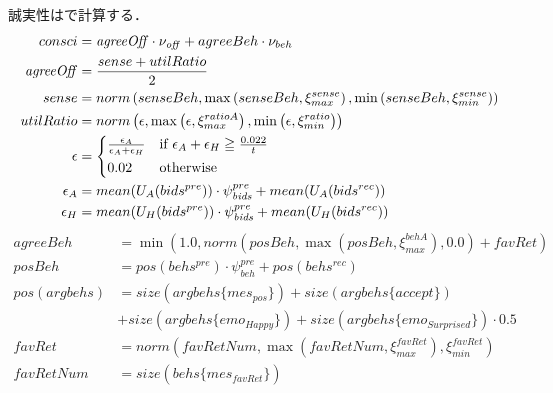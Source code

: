 誠実性はで計算する．
\begin{align}
    consci &= \mathit{agreeOff} \cdot \nu_{\mathit{off}} + agreeBeh \cdot \nu_{beh} \label{eq:conscientiousness} \\
    \mathit{agreeOff} &= \frac{sense + utilRatio}{2} \nonumber \\
    sense &= norm \left(senseBeh, \max \left(senseBeh, \xi_{max}^{sense}\right), \min \left(senseBeh, \xi_{min}^{sense}\right) \right) \nonumber \\
    utilRatio &= norm \left(\epsilon, \max \left(\epsilon, \xi_{max}^{ratioA}\right), \min \left(\epsilon, \xi_{min}^{ratio}\right) \right) \nonumber \\
    \epsilon &= 
    \begin{cases*}
        \frac{\epsilon_A}{\epsilon_A + \epsilon_H} & if $\epsilon_A + \epsilon_H \geqq \frac{0.022}{t}$  \\
        0.02 & otherwise 
    \end{cases*} \nonumber \\
    \epsilon_A &= mean(U_A(bids^{pre})) \cdot \psi_{\mathit{bids}}^{pre} + mean(U_A(bids^{rec})) \nonumber \\
    \epsilon_H &= mean(U_H(bids^{pre})) \cdot \psi_{\mathit{bids}}^{pre} + mean(U_H(bids^{rec})) \nonumber 
\end{align}
\begin{align}
    agreeBeh &= \min \left( 1.0, norm\left( \mathit{posBeh}, \max \left( \mathit{posBeh}, \xi_{max}^{\mathit{behA}}\right), 0.0 \right) + \mathit{favRet}\right) \nonumber \\
    posBeh &=  pos(behs^{pre}) \cdot \psi_{beh}^{pre} + pos(behs^{rec}) \nonumber \\
    pos(argbehs) &= size(argbehs\{mes_{pos}\}) + size(argbehs\{accept\}) \nonumber \\
    &+ size(argbehs\{emo_{Happy}\}) \nonumber + size(argbehs\{emo_{Surprised}\}) \cdot 0.5 \nonumber \\
    \mathit{favRet} &= norm\left( \mathit{favRetNum}, \max \left( \mathit{favRetNum}, \xi_{max}^{\mathit{favRet}}\right), \xi_{min}^{\mathit{favRet}} \right) \nonumber \\
    \mathit{favRetNum} &= size(behs\{mes_{\mathit{favRet}}\}) \nonumber
\end{align}

